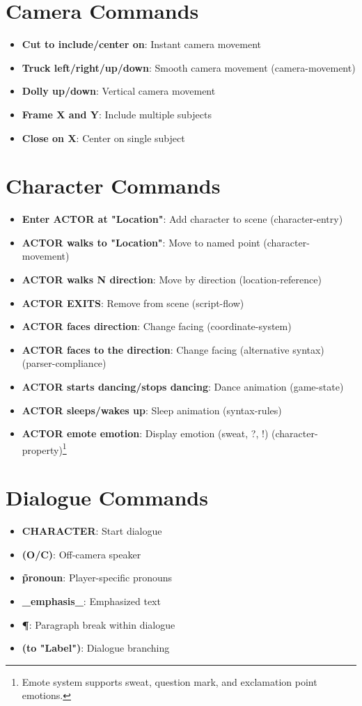 \documentclass[11pt,letterpaper,oldstylefigures]{memoir}
\newcommand{\fountain}[1]{\textbf{#1}}
\begin{document}
\section{Camera Commands}
\begin{itemize}
\item \fountain{Cut to include/center on}: Instant camera movement
\item \fountain{Truck left/right/up/down}: Smooth camera movement (\gls{camera-movement})
\item \fountain{Dolly up/down}: Vertical camera movement
\item \fountain{Frame X and Y}: Include multiple subjects
\item \fountain{Close on X}: Center on single subject
\end{itemize}

\section{Character Commands}
\begin{itemize}
\item \fountain{Enter ACTOR at "Location"}: Add character to scene (\gls{character-entry})
\item \fountain{ACTOR walks to "Location"}: Move to named point (\gls{character-movement})
\item \fountain{ACTOR walks N direction}: Move by direction (\gls{location-reference})
\item \fountain{ACTOR EXITS}: Remove from scene (\gls{script-flow})
\item \fountain{ACTOR faces direction}: Change facing (\gls{coordinate-system})
\item \fountain{ACTOR faces to the direction}: Change facing (alternative syntax) (\gls{parser-compliance})
\item \fountain{ACTOR starts dancing/stops dancing}: Dance animation (\gls{game-state})
\item \fountain{ACTOR sleeps/wakes up}: Sleep animation (\gls{syntax-rules})
\item \fountain{ACTOR emote emotion}: Display emotion (sweat, ?, !) (\gls{character-property})\footnote{Emote system supports sweat, question mark, and exclamation point emotions.}
\end{itemize}

\section{Dialogue Commands}
\begin{itemize}
\item \fountain{CHARACTER}: Start dialogue
\item \fountain{(O/C)}: Off-camera speaker
\item \fountain{\~pronoun}: Player-specific pronouns
\item \fountain{\_emphasis\_}: Emphasized text
\item \fountain{¶}: Paragraph break within dialogue
\item \fountain{(to "Label")}: Dialogue branching
\end{itemize}
\end{document}

